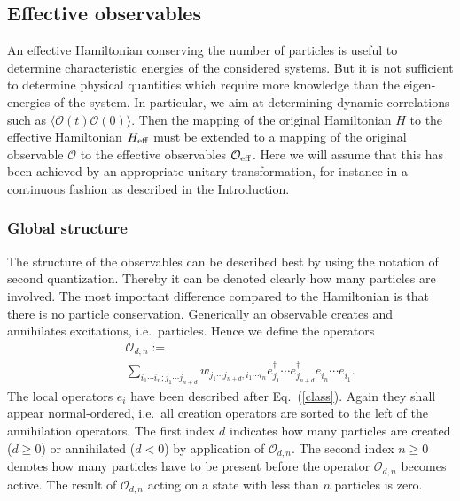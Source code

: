 \subsection{Effective observables}
An effective Hamiltonian conserving the number of particles
is useful to determine characteristic energies of the 
considered systems. But it is not sufficient to determine
physical quantities which require more knowledge than
the eigen-energies of the system. In particular, we aim at
determining dynamic correlations such as 
$\langle {\mathcal O}(t) {\mathcal O}(0)\rangle$. Then the mapping 
of the original Hamiltonian $H$ to the effective Hamiltonian $H_{\rm eff}$
must be extended to a mapping of the original observable
 ${\mathcal O}$ to the  effective observables ${\mathcal O}_{\rm eff}$.
Here we will assume that this has been achieved by an appropriate
unitary transformation, for instance in a continuous fashion
as described in the Introduction.

\subsubsection{Global structure}
The structure of the observables can be described best 
by using the notation of second quantization. Thereby it
can be denoted clearly how many particles are involved.
The most important difference compared to the Hamiltonian
is that there is no particle conservation. Generically an observable
creates and annihilates excitations, i.e.\ particles. Hence we define
the operators  
\begin{eqnarray}
  \label{O_dn}
  &&{\mathcal O}_{d,n}:= \\ \nonumber
&&\sum_{i_1\cdots i_n;j_1\cdots j_{n+d}} 
w_{j_1\cdots j_{n+d};i_1\cdots i_n} e^{\dagger}_{j_{1}}\cdots
  e^{\dagger}_{j_{n+d}} e^{\phantom\dagger}_{i_n}\cdots
  e^{\phantom\dagger}_{i_1} .
\end{eqnarray}
The local operators $e_i$ have been described after Eq.~(\ref{class}). Again 
they shall appear normal-ordered, i.e.\ all creation operators are sorted  
to the left 
of the annihilation operators. The first index $d$ indicates how many 
particles are created ($d\ge 0$) or annihilated ($d<0$) by application of
 ${\mathcal O}_{d,n}$. The second index $n\ge0$ denotes how many particles
have to be present before the operator ${\mathcal O}_{d,n}$ becomes active.
The result of ${\mathcal O}_{d,n}$ acting on a state
with less than $n$ particles is zero.

